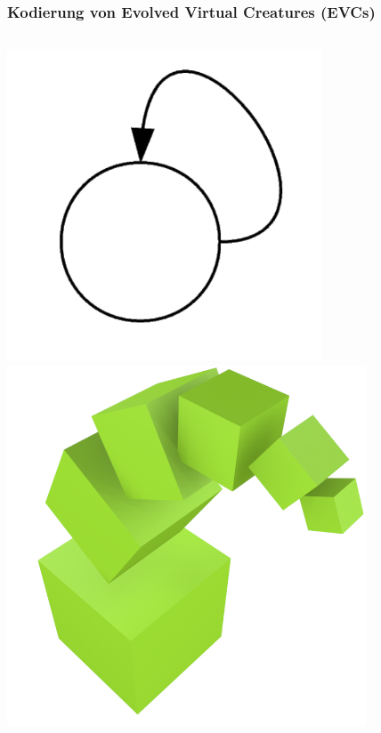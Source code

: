 \documentclass{beamer}
\begin{document}
\begin{frame}
	\frametitle{Kodierung von Evolved Virtual Creatures (EVCs)}
	\begin{columns}[c]
		\centering
		\includegraphics[width=0.7\textwidth]{img/g2.png} \pause
		\centering
		\includegraphics[width=0.8\textwidth]{img/2.png}
	\end{columns}
\end{frame}
\end{document}
